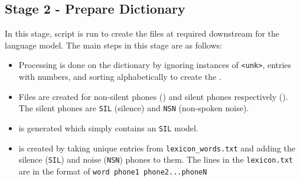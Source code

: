 \subsection{Stage 2 - Prepare Dictionary}
In this stage,  script is run to create the files at  required downstream for the language model.
The main steps in this stage are as follows:
\begin{itemize}
    \item Processing is done on the  dictionary by ignoring instances of \texttt{<unk>}, entries with numbers, and sorting alphabetically to create the .
    
    \item Files are created for non-silent phones () and silent phones respectively (). The silent phones are \texttt{SIL} (silence) and \texttt{NSN} (non-spoken noise).
    
    \item {} is generated which simply contains an \texttt{SIL} model.
    \item {} is created by taking unique entries from \texttt{lexicon\_words.txt} and adding the silence (\texttt{SIL}) and noise (\texttt{NSN}) phones to them. The lines in the \texttt{lexicon.txt} are in the format of \texttt{word phone1 phone2...phoneN}
\end{itemize}

